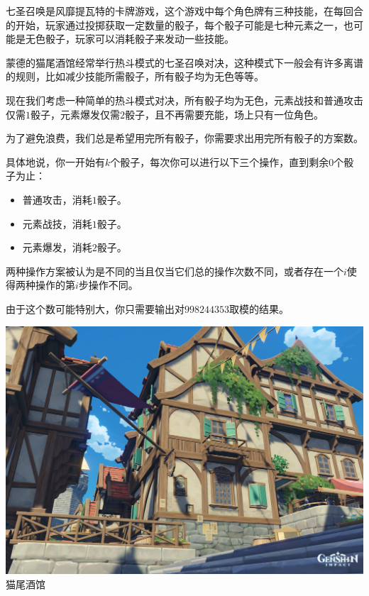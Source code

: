 七圣召唤是风靡提瓦特的卡牌游戏，这个游戏中每个角色牌有三种技能，在每回合的开始，玩家通过投掷获取一定数量的骰子，每个骰子可能是七种元素之一，也可能是无色骰子，玩家可以消耗骰子来发动一些技能。

蒙德的猫尾酒馆经常举行热斗模式的七圣召唤对决，这种模式下一般会有许多离谱的规则，比如减少技能所需骰子，所有骰子均为无色等等。

现在我们考虑一种简单的热斗模式对决，所有骰子均为无色，元素战技和普通攻击仅需$1$骰子，元素爆发仅需$2$骰子，且不再需要充能，场上只有一位角色。

为了避免浪费，我们总是希望用完所有骰子，你需要求出用完所有骰子的方案数。

具体地说，你一开始有$k$个骰子，每次你可以进行以下三个操作，直到剩余$0$个骰子为止：
\begin{itemize}
\item 普通攻击，消耗$1$骰子。
\item 元素战技，消耗$1$骰子。
\item 元素爆发，消耗$2$骰子。
\end{itemize}

两种操作方案被认为是不同的当且仅当它们总的操作次数不同，或者存在一个$i$使得两种操作的第$i$步操作不同。

由于这个数可能特别大，你只需要输出对$998244353$取模的结果。

\begin{center}
  \includegraphics[scale=0.15]{cattail.jpg} \\
  \small{猫尾酒馆}
\end{center}

